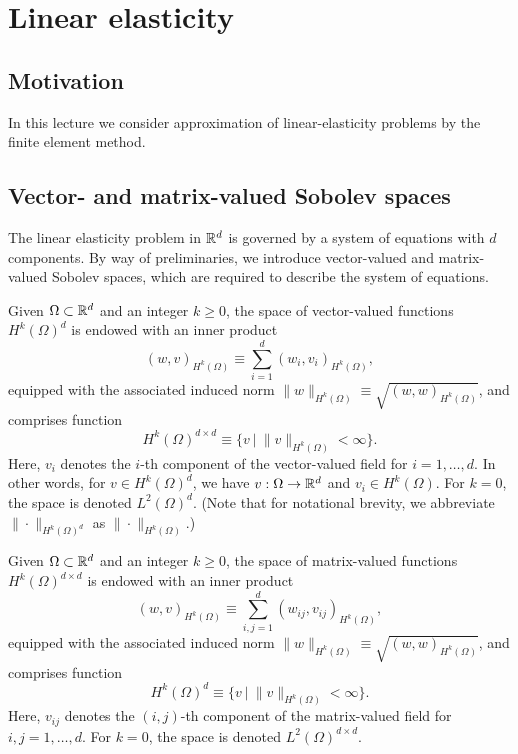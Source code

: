 \chapter{Linear elasticity}

\disclaimer

\section{Motivation}
In this lecture we consider approximation of linear-elasticity problems by the finite element method.

\section{Vector- and matrix-valued Sobolev spaces}
The linear elasticity problem in $\mathbb{R}^d$ is governed by a system of equations with $d$ components. By way of preliminaries, we introduce vector-valued and matrix-valued Sobolev spaces, which are required to describe the system of equations.
\begin{definition}
  Given $\Omega \subset \mathbb{R}^d$ and an integer $k \geq 0$, the space of vector-valued functions $H^k(\Omega)^d$ is endowed with an inner product
  \begin{equation*}
    (w,v)_{H^k(\Omega)} \equiv \sum_{i=1}^d (w_i,v_i)_{H^k(\Omega)},
  \end{equation*}
  equipped with the associated induced norm $\| w \|_{H^k(\Omega)} \equiv \sqrt{(w,w)_{H^k(\Omega)}}$, and comprises function
  \begin{equation*}
    H^k(\Omega)^{d \times d} \equiv \{ v \ | \ \| v \|_{H^k(\Omega)} < \infty \}.
  \end{equation*}
  Here, $v_i$ denotes the $i$-th component of the vector-valued field for $i = 1,\dots,d$. In other words, for $v \in H^k(\Omega)^d$, we have $v: \Omega \to \mathbb{R}^d$ and $v_i \in H^k(\Omega)$.  For $k = 0$, the space is denoted $L^2(\Omega)^d$.  (Note that for notational brevity, we abbreviate $\| \cdot \|_{H^k(\Omega)^d}$ as $\| \cdot \|_{H^k(\Omega)}$.)
\end{definition}
\begin{definition}
  Given $\Omega \subset \mathbb{R}^d$ and an integer $k \geq 0$, the space of matrix-valued functions $H^k(\Omega)^{d \times d}$ is endowed with an inner product
  \begin{equation*}
    (w,v)_{H^k(\Omega)} \equiv \sum_{i,j=1}^d (w_{ij},v_{ij})_{H^k(\Omega)},
  \end{equation*}
  equipped with the associated induced norm $\| w \|_{H^k(\Omega)} \equiv \sqrt{(w,w)_{H^k(\Omega)}}$, and comprises function
  \begin{equation*}
    H^k(\Omega)^d \equiv \{ v \ | \ \| v \|_{H^k(\Omega)} < \infty \}.
  \end{equation*}
  Here, $v_{ij}$ denotes the $(i,j)$-th component of the matrix-valued field for $i,j = 1,\dots,d$. For $k = 0$, the space is denoted $L^2(\Omega)^{d \times d}$.
\end{definition}
